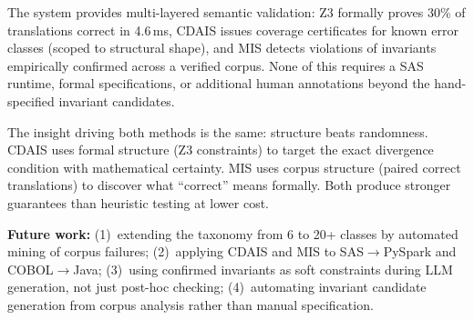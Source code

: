 \documentclass[conference]{IEEEtran}
\begin{document}
The system provides multi-layered semantic validation: Z3 formally proves 30\% of
translations correct in 4.6\,ms, CDAIS issues coverage certificates for known error
classes (scoped to structural shape), and MIS detects violations of invariants
empirically confirmed across a verified corpus. None of this requires a SAS runtime,
formal specifications, or additional human annotations beyond the hand-specified
invariant candidates.

The insight driving both methods is the same: structure beats randomness. CDAIS uses
formal structure (Z3 constraints) to target the exact divergence condition with
mathematical certainty. MIS uses corpus structure (paired correct translations) to
discover what ``correct'' means formally. Both produce stronger guarantees than
heuristic testing at lower cost.

\textbf{Future work:} (1)~extending the taxonomy from 6 to 20+ classes by automated
mining of corpus failures; (2)~applying CDAIS and MIS to SAS$\rightarrow$PySpark
and COBOL$\rightarrow$Java; (3)~using confirmed invariants as soft constraints
during LLM generation, not just post-hoc checking; (4)~automating invariant
candidate generation from corpus analysis rather than manual specification.
\end{document}
